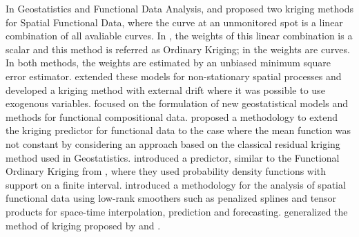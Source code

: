 \documentclass[12pt]{interact}
\theoremstyle{plain}%
\theoremstyle{definition}
\theoremstyle{remark}
\begin{document}
In Geostatistics and Functional Data Analysis, \citet{giraldo2010continuous} and \citet{giraldo2011ordinary} proposed two kriging methods for Spatial Functional Data, where the curve at an
unmonitored spot is a linear combination of all avaliable curves. In \citet{giraldo2011ordinary}, the weights of this linear combination is a scalar and this method is referred as
Ordinary Kriging; in \citet{giraldo2010continuous} the weights are curves. In both methods, the weights are estimated by an unbiased minimum square error estimator.
\citet{caballero2013universal} extended these models for non-stationary spatial processes and \citet{ignaccolo2014kriging} developed a kriging method with external drift where it was possible to use exogenous variables.
\citet{menafoglio2014kriging} focused on the formulation of new geostatistical models and methods for functional compositional data.
\citet{reyesresidual} proposed a methodology to extend the kriging predictor for functional data to the case where the mean function was not constant by considering an approach based on the classical residual kriging method used in Geostatistics. \citet{salazar2015spatial} introduced a predictor, similar to the Functional Ordinary Kriging from \citet{giraldo2011ordinary}, where they used probability density functions with support on a finite interval.
\citet{lee2015spatio} introduced a methodology for the analysis of spatial functional data using low-rank smoothers such as penalized splines and tensor products for space-time interpolation, prediction and forecasting.
\citet{nerini2010cokriging} generalized the method of kriging proposed by \citet{giraldo2010continuous} and \citet{giraldo2011ordinary}.
\end{document}
